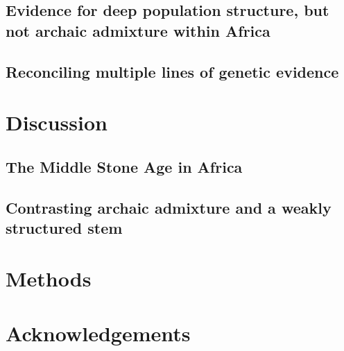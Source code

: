 \documentclass[]{article}
\begin{document}
\subsection*{Evidence for deep population structure, but not archaic admixture within Africa}

\subsection*{Reconciling multiple lines of genetic evidence}

\section*{Discussion}

\subsection*{The Middle Stone Age in Africa}

\subsection*{Contrasting archaic admixture and a weakly structured stem}

\section*{Methods}
\cite{Kelleher2016-lw}

\section*{Acknowledgements}

\break



\end{document}
